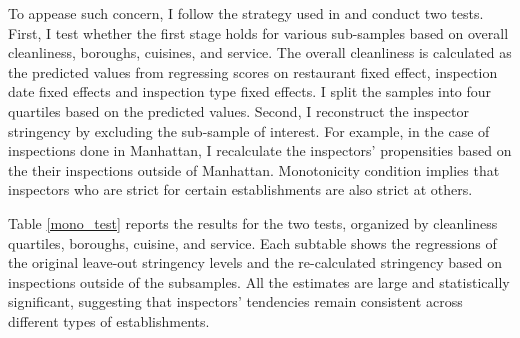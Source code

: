 \documentclass[11pt]{article}
\begin{document}
To appease such concern, I follow the strategy used in \cite{bhuller_16} and conduct two tests. First, I test whether the first stage holds for various sub-samples based on overall cleanliness, boroughs, cuisines, and service. The overall cleanliness is calculated as the predicted values from regressing scores on restaurant fixed effect, inspection date fixed effects and inspection type fixed effects. I split the samples into four quartiles based on the predicted values. Second, I reconstruct the inspector stringency by excluding the sub-sample of interest. For example, in the case of inspections done in Manhattan, I recalculate the inspectors' propensities based on the their inspections outside of Manhattan. Monotonicity condition implies that inspectors who are strict for certain establishments are also strict at others. 

Table \ref{mono_test} reports the results for the two tests, organized by cleanliness quartiles, boroughs, cuisine, and service. Each subtable shows the regressions of the original leave-out stringency levels and the re-calculated stringency based on inspections outside of the subsamples. All the estimates are large and statistically significant, suggesting that inspectors' tendencies remain consistent across different types of establishments. 
\end{document}
